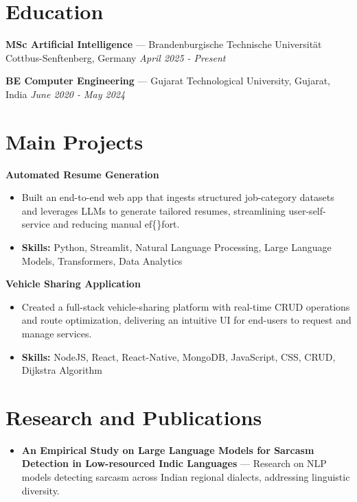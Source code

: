 \documentclass[a4paper,10pt]{article}
\begin{document}
\section*{Education}
\textbf{MSc Artificial Intelligence} — Brandenburgische Technische Universität Cottbus-Senftenberg, Germany \hfill \textit{April 2025 - Present}\par
\vspace{1.5pt}
\textbf{BE Computer Engineering} — Gujarat Technological University, Gujarat, India \hfill \textit{June 2020 - May 2024}\par

\section*{Main Projects}
\textbf{Automated Resume Generation}\par
\vspace{1pt}
\begin{itemize}
  \item Built an end-to-end web app that ingests structured job-category datasets and leverages LLMs to generate tailored resumes, streamlining user-self-service and reducing manual ef\{\}fort.
  \item \textbf{Skills:} Python, Streamlit, Natural Language Processing, Large Language Models, Transformers, Data Analytics
\end{itemize}
\vspace{3pt}
\textbf{Vehicle Sharing Application}\par
\vspace{1pt}
\begin{itemize}
  \item Created a full-stack vehicle-sharing platform with real-time CRUD operations and route optimization, delivering an intuitive UI for end-users to request and manage services.
  \item \textbf{Skills:} NodeJS, React, React-Native, MongoDB, JavaScript, CSS, CRUD, Dijkstra Algorithm
\end{itemize}

\section*{Research and Publications}
\begin{itemize}
\item \textbf{An Empirical Study on Large Language Models for Sarcasm Detection in Low-resourced Indic Languages} — Research on NLP models detecting sarcasm across Indian regional dialects, addressing linguistic diversity.
\end{itemize}
\end{document}

